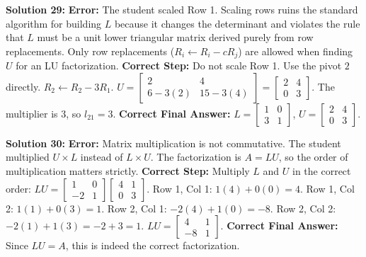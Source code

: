 \documentclass[11pt]{article}
\begin{document}
\vspace{0.5cm}
\textbf{Solution 29:}
\textbf{Error:} The student scaled Row 1. Scaling rows ruins the standard algorithm for building $L$ because it changes the determinant and violates the rule that $L$ must be a unit lower triangular matrix derived purely from row replacements. Only row replacements ($R_i \leftarrow R_i - cR_j$) are allowed when finding $U$ for an LU factorization.
\textbf{Correct Step:} Do not scale Row 1. Use the pivot $2$ directly.
$R_2 \leftarrow R_2 - 3R_1$.
$U = \begin{bmatrix} 2 & 4 \\ 6 - 3(2) & 15 - 3(4) \end{bmatrix} = \begin{bmatrix} 2 & 4 \\ 0 & 3 \end{bmatrix}$.
The multiplier is $3$, so $l_{21} = 3$.
\textbf{Correct Final Answer:} $L = \begin{bmatrix} 1 & 0 \\ 3 & 1 \end{bmatrix}$, $U = \begin{bmatrix} 2 & 4 \\ 0 & 3 \end{bmatrix}$.

\vspace{0.5cm}
\textbf{Solution 30:}
\textbf{Error:} Matrix multiplication is not commutative. The student multiplied $U \times L$ instead of $L \times U$. The factorization is $A = LU$, so the order of multiplication matters strictly.
\textbf{Correct Step:} Multiply $L$ and $U$ in the correct order:
$LU = \begin{bmatrix} 1 & 0 \\ -2 & 1 \end{bmatrix} \begin{bmatrix} 4 & 1 \\ 0 & 3 \end{bmatrix}$.
Row 1, Col 1: $1(4) + 0(0) = 4$.
Row 1, Col 2: $1(1) + 0(3) = 1$.
Row 2, Col 1: $-2(4) + 1(0) = -8$.
Row 2, Col 2: $-2(1) + 1(3) = -2 + 3 = 1$.
$LU = \begin{bmatrix} 4 & 1 \\ -8 & 1 \end{bmatrix}$.
\textbf{Correct Final Answer:} Since $LU = A$, this is indeed the correct factorization.
\end{document}
